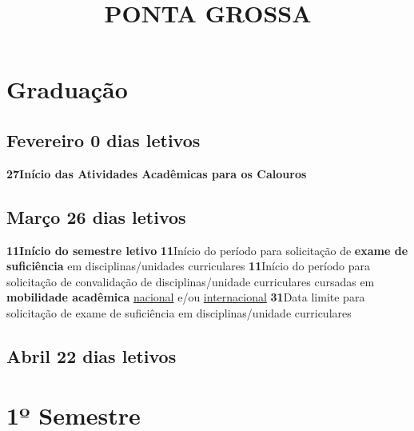 \documentclass[thesis]{hmcposter}
\author{ }
\title{PONTA GROSSA}
\begin{document}
\begin{poster}
\normalsize\section{\color{hmcorange}Graduação}\subsection{Fevereiro \hfill 0 dias letivos}\textbf{27}\qquad \textbf{Início das Atividades Acadêmicas para os Calouros} \newline \null\subsection{Março \hfill 26 dias letivos}\textbf{11}\qquad \textbf{Início do semestre letivo} \newline \null\textbf{11}\qquad Início do período para solicitação de \textbf{exame de suficiência} em disciplinas/unidades curriculares \newline \null\textbf{11}\qquad Início do período para solicitação de convalidação de disciplinas/unidade curriculares cursadas em \textbf{mobilidade acadêmica} \underline{nacional} e/ou \underline{internacional} \newline \null\textbf{31}\qquad Data limite para solicitação de exame de suficiência em disciplinas/unidade curriculares \newline \null\subsection{Abril \hfill 22 dias letivos}\vfill\null
\columnbreak
\section{\hfill \color{hmcorange}1º Semestre}

\end{poster}
\end{document}
